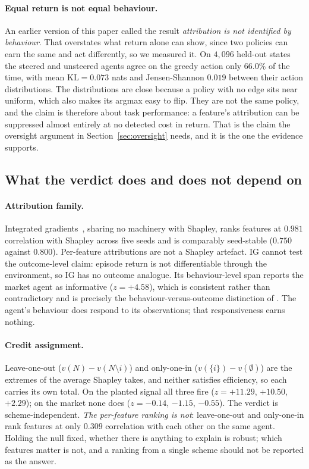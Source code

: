 \documentclass[10pt,twocolumn]{article}
\newcommand{\vfn}{v}
\begin{document}
\paragraph{Equal return is not equal behaviour.} An earlier version of this
paper called the result \emph{attribution is not identified by behaviour}. That
overstates what return alone can show, since two policies can earn the same and
act differently, so we measured it. On $4{,}096$ held-out states the steered and
unsteered agents agree on the greedy action only $66.0\%$ of the time, with mean
$\mathrm{KL} = 0.073$ nats and Jensen-Shannon $0.019$ between their action
distributions. The distributions are close because a policy with no edge sits
near uniform, which also makes its argmax easy to flip. They are not the same
policy, and the claim is therefore about task performance: a feature's
attribution can be suppressed almost entirely at no detected cost in return.
That is the claim the oversight argument in Section~\ref{sec:oversight} needs,
and it is the one the evidence supports.

\subsection{What the verdict does and does not depend on}
\label{sec:robust}

\paragraph{Attribution family.} Integrated gradients~\citep{sundararajan2017axiomatic},
sharing no machinery with Shapley, ranks features at $0.981$ correlation with Shapley across five seeds and
is comparably seed-stable ($0.750$ against $0.800$). Per-feature attributions are
not a Shapley artefact. IG cannot test the outcome-level claim: episode return is
not differentiable through the environment, so IG has no outcome analogue. Its
behaviour-level span reports the market agent as informative ($z=+4.58$), which
is consistent rather than contradictory and is precisely the
behaviour-versus-outcome distinction of \citet{beechey2023sverl}. The agent's
behaviour does respond to its observations; that responsiveness earns nothing.

\paragraph{Credit assignment.} Leave-one-out ($\vfn(N)-\vfn(N\setminus i)$) and
only-one-in ($\vfn(\{i\})-\vfn(\emptyset)$) are the extremes of the average
Shapley takes, and neither satisfies efficiency, so each carries its own total.
On the planted signal all three fire ($z = +11.29$, $+10.50$, $+2.29$); on the
market none does ($z = -0.14$, $-1.15$, $-0.55$). The verdict is
scheme-independent. \emph{The per-feature ranking is not}: leave-one-out and
only-one-in rank features at only $0.309$ correlation with each other on the same
agent. Holding the null fixed, whether there is anything to explain is robust; which features matter is
not, and a ranking from a single scheme should not be reported as the answer.
\end{document}
